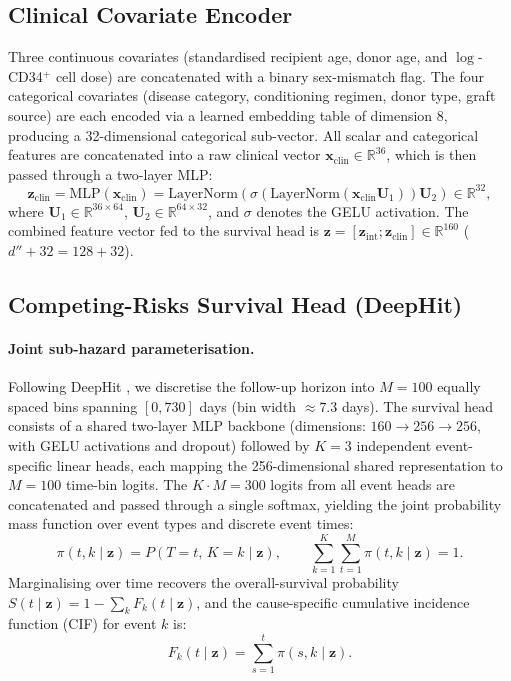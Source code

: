 \documentclass[11pt,a4paper]{article}
\begin{document}
\subsection{Clinical Covariate Encoder}
\label{sec:clinical}

Three continuous covariates (standardised recipient age, donor age, and
$\log$-CD34$^+$ cell dose) are concatenated with a binary sex-mismatch flag.
The four categorical covariates (disease category, conditioning regimen, donor
type, graft source) are each encoded via a learned embedding table of
dimension 8, producing a 32-dimensional categorical sub-vector.  All scalar
and categorical features are concatenated into a raw clinical vector
$\mathbf{x}_{\mathrm{clin}} \in \mathbb{R}^{36}$, which is then passed
through a two-layer MLP:
\begin{equation}
  \mathbf{z}_{\mathrm{clin}} = \mathrm{MLP}(\mathbf{x}_{\mathrm{clin}})
    = \mathrm{LayerNorm}\!\left(
        \sigma\!\left(
          \mathrm{LayerNorm}(\mathbf{x}_{\mathrm{clin}} \mathbf{U}_1)
        \right) \mathbf{U}_2
      \right) \in \mathbb{R}^{32},
  \label{eq:clin}
\end{equation}
where $\mathbf{U}_1 \in \mathbb{R}^{36 \times 64}$, $\mathbf{U}_2 \in
\mathbb{R}^{64 \times 32}$, and $\sigma$ denotes the GELU activation.  The
combined feature vector fed to the survival head is
$\mathbf{z} = [\mathbf{z}_{\mathrm{int}} ; \mathbf{z}_{\mathrm{clin}}]
\in \mathbb{R}^{160}$ ($d'' + 32 = 128 + 32$).

\subsection{Competing-Risks Survival Head (DeepHit)}
\label{sec:deephit}

\paragraph{Joint sub-hazard parameterisation.}
Following DeepHit \citep{lee2018deephit}, we discretise the follow-up horizon
into $M = 100$ equally spaced bins spanning $[0, 730]$ days (bin width
$\approx 7.3$ days).  The survival head consists of a shared two-layer MLP
backbone (dimensions: $160 \to 256 \to 256$, with GELU activations and
dropout) followed by $K = 3$ independent event-specific linear heads, each
mapping the 256-dimensional shared representation to $M = 100$ time-bin logits.
The $K \cdot M = 300$ logits from all event heads are concatenated and passed
through a single softmax, yielding the joint probability
mass function over event types and discrete event times:
\begin{equation}
  \pi(t, k \mid \mathbf{z})
    = P(T = t,\, K = k \mid \mathbf{z}),
  \qquad
  \sum_{k=1}^{K} \sum_{t=1}^{M} \pi(t, k \mid \mathbf{z}) = 1.
  \label{eq:joint}
\end{equation}
Marginalising over time recovers the overall-survival probability
$S(t \mid \mathbf{z}) = 1 - \sum_{k} F_k(t \mid \mathbf{z})$, and the
cause-specific cumulative incidence function (CIF) for event $k$ is:
\begin{equation}
  F_k(t \mid \mathbf{z})
    = \sum_{s=1}^{t} \pi(s, k \mid \mathbf{z}).
  \label{eq:cif}
\end{equation}
\end{document}
